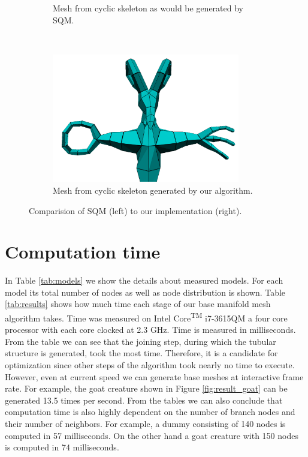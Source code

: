 \begin{figure}[ht]
\begin{subfigure}[b]{0.45\textwidth}
            \caption{Mesh from cyclic skeleton as would be generated by SQM.}
            \label{fig:comp_cycle_sqm}
        \end{subfigure}
        ~ %
        \begin{subfigure}[b]{0.45\textwidth}
        	\centering
			\includegraphics[width=0.9\textwidth]{images/goat_amput_3}
            \caption{Mesh from cyclic skeleton generated by our algorithm.}
            \label{fig:comp_cycle}
        \end{subfigure}
        \caption{Comparision of SQM (left) to our implementation (right).}
        \label{fig:comp_ilu}
\end{figure}

\section{Computation time}

In Table \ref{tab:models} we show the details about measured models.
For each model its total number of nodes as well as node distribution is shown.
Table \ref{tab:results} shows how much time each stage of our base manifold mesh algorithm takes.
Time was measured on Intel\textsuperscript{\textregistered}  Core\textsuperscript{TM} i7-3615QM a four core processor with each core clocked at 2.3 GHz.
Time is measured in milliseconds.
From the table we can see that the joining step, during which the tubular structure is generated, took the most time.
Therefore, it is a candidate for optimization since other steps of the algorithm took nearly no time to execute.
However, even at current speed we can generate base meshes at interactive frame rate.
For example, the goat creature shown in Figure \ref{fig:result_goat} can be generated 13.5 times per second.
From the tables we can also conclude that computation time is also highly dependent on the number of branch nodes and their number of neighbors.
For example, a dummy consisting of 140 nodes is computed in 57 milliseconds.
On the other hand a goat creature with 150 nodes is computed in 74 milliseconds.

